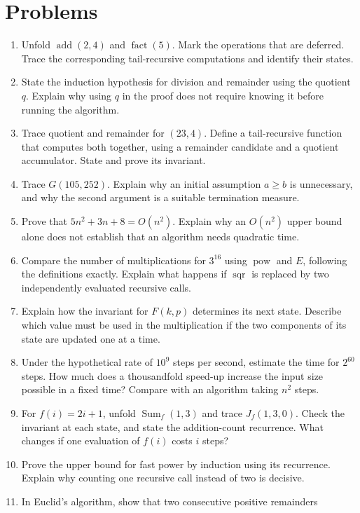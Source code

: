 \section*{Problems}
\begin{enumerate}
\item Unfold $\operatorname{add}(2,4)$ and $\operatorname{fact}(5)$.
Mark the operations that are deferred. Trace the corresponding tail-recursive
computations and identify their states.
\item State the induction hypothesis for division and remainder using the
quotient $q$. Explain why using $q$ in the proof does not require knowing
it before running the algorithm.
\item Trace quotient and remainder for $(23,4)$. Define a tail-recursive
function that computes both together, using a remainder candidate and a
quotient accumulator. State and prove its invariant.
\item Trace $G(105,252)$. Explain why an initial assumption $a\geq b$ is
unnecessary, and why the second argument is a suitable termination measure.
\item Prove that $5n^2+3n+8=O(n^2)$. Explain why an $O(n^2)$ upper bound
alone does not establish that an algorithm needs quadratic time.
\item Compare the number of multiplications for $3^{16}$ using
$\operatorname{pow}$ and $E$, following the definitions exactly. Explain
what happens if $\operatorname{sqr}$ is replaced by two independently
evaluated recursive calls.
\item Explain how the invariant for $F(k,p)$ determines its next state. Describe which value must be used
in the multiplication if the two components of its state are updated one
at a time.
\item Under the hypothetical rate of $10^9$ steps per second, estimate the
time for $2^{60}$ steps. How much does a thousandfold speed-up increase the
input size possible in a fixed time? Compare with an algorithm taking $n^2$
steps.
\item For $f(i)=2i+1$, unfold $\operatorname{Sum}_f(1,3)$ and trace
$J_f(1,3,0)$. Check the invariant at each state, and state the addition-count
recurrence. What changes if one evaluation of $f(i)$ costs $i$ steps?
\item Prove the upper bound for fast power by induction using its recurrence.
Explain why counting one recursive call instead of two is decisive.
\item In Euclid's algorithm, show that two consecutive positive remainders

\end{enumerate}
